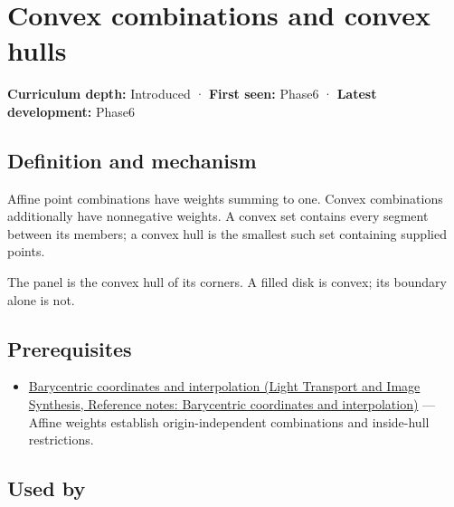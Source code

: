 \hypertarget{appendix-0026ec42c9d5}{}\label{referencestart:appendix-0026ec42c9d5}
\section{Convex combinations and convex hulls}\label{appendix-0026ec42c9d5-convex-combinations-and-convex-hulls}

\hypertarget{appendix-0026ec42c9d5-convex-combinations-and-convex-hulls}{}

\textbf{Curriculum depth:} Introduced · \textbf{First seen:} Phase6 · \textbf{Latest development:} Phase6

\begin{allmightroledefinition}

\subsection{Definition and mechanism}\label{appendix-0026ec42c9d5-definition-and-mechanism}

\hypertarget{appendix-0026ec42c9d5-definition-and-mechanism}{}

Affine point combinations have weights summing to one. Convex combinations additionally have nonnegative weights. A convex set contains every segment between its members; a convex hull is the smallest such set containing supplied points.

\end{allmightroledefinition}

The panel is the convex hull of its corners. A filled disk is convex; its boundary alone is not.

\subsection{Prerequisites}\label{appendix-0026ec42c9d5-prerequisites}

\hypertarget{appendix-0026ec42c9d5-prerequisites}{}

\begin{itemize}
\tightlist
\item
  \href{../04-Light-Transport-and-Image-Synthesis/main.pdf\#nameddest=appendix-02b9d9a81dca}{Barycentric coordinates and interpolation (Light Transport and Image Synthesis, Reference notes: Barycentric coordinates and interpolation)} --- Affine weights establish origin-independent combinations and inside-hull restrictions.
\end{itemize}

\subsection{Used by}\label{appendix-0026ec42c9d5-used-by}

